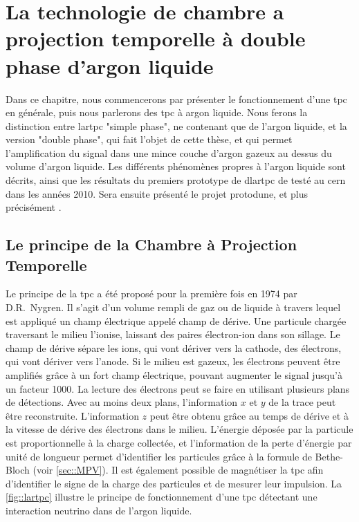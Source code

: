 
\chapter{La technologie de chambre a projection temporelle à double phase d'argon liquide}

  Dans ce chapitre, nous commencerons par présenter le fonctionnement d'une \gls{tpc} en générale, puis nous parlerons des \gls{tpc} à argon liquide. Nous ferons la distinction entre \gls{lartpc} "simple phase", ne contenant que de l'argon liquide, et la version "double phase", qui fait l'objet de cette thèse, et qui permet l'amplification du signal dans une mince couche d'argon gazeux au dessus du volume d'argon liquide. Les différents phénomènes propres à l'argon liquide sont décrits, ainsi que les résultats du premiers prototype de \gls{dlartpc} de \threeL{} testé au \gls{cern} dans les années 2010. Sera ensuite présenté le projet proto\gls{dune}, et plus précisément \protodp{}.
    
  \section{Le principe de la Chambre à Projection Temporelle}
    Le principe de la \acrfull{tpc} a été proposé pour la première fois en 1974 par D.R.~Nygren\cite{Nygren1974}. Il s'agit d'un volume rempli de gaz ou de liquide à travers lequel est appliqué un champ électrique appelé champ de dérive. Une particule chargée traversant le milieu l'ionise, laissant des paires électron-ion dans son sillage. Le champ de dérive sépare les ions, qui vont dériver vers la cathode, des électrons, qui vont dériver vers l'anode. Si le milieu est gazeux, les électrons peuvent être amplifiés grâce à un fort champ électrique, pouvant augmenter le signal jusqu'à un facteur 1000. La lecture des électrons peut se faire en utilisant plusieurs plans de détections. Avec au moins deux plans, l'information $x$ et $y$ de la trace peut être reconstruite. L'information $z$ peut être obtenu grâce au temps de dérive et à la vitesse de dérive des électrons dans le milieu. L'énergie déposée par la particule est proportionnelle à la charge collectée, et l'information de la perte d'énergie par unité de longueur permet d'identifier les particules grâce à la formule de Bethe-Bloch (voir \autoref{sec::MPV}). Il est également possible de magnétiser la \gls{tpc} afin d'identifier le signe de la charge des particules et de mesurer leur impulsion. La \autoref{fig::lartpc} illustre le principe de fonctionnement d'une \gls{tpc} détectant une interaction neutrino dans de l'argon liquide.

